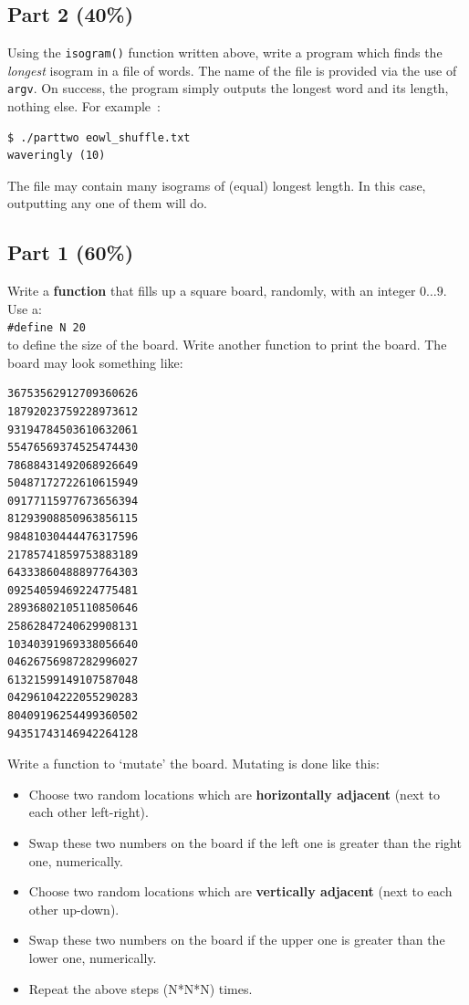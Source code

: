 \begin{appendices}
\subsection*{Part 2 (40\%)}
Using the \verb^isogram()^ function written above, write a program which finds the {\it longest} isogram in a
file of words. The name of the file is provided via the use of \verb^argv^.
On success, the program simply outputs the longest word and its length, nothing else. For
example~:
\begin{verbatim}
$ ./parttwo eowl_shuffle.txt
waveringly (10)
\end{verbatim}

The file may contain many isograms of (equal) longest length. In this case,
outputting any one of them will do. 

\subsection*{Part 1 (60\%)}

Write a {\bf function} that fills up a square board, randomly,
with an integer $0 \dots 9$. Use a:\\
\verb^#define N 20^\\
to define the size of the board.  Write another function to print the board.
The board may look something like:

{\small
\begin{verbatim}
36753562912709360626
18792023759228973612
93194784503610632061
55476569374525474430
78688431492068926649
50487172722610615949
09177115977673656394
81293908850963856115
98481030444476317596
21785741859753883189
64333860488897764303
09254059469224775481
28936802105110850646
25862847240629908131
10340391969338056640
04626756987282996027
61321599149107587048
04296104222055290283
80409196254499360502
94351743146942264128
\end{verbatim}
}

Write a
function to `mutate' the board. Mutating is done like this:
\begin{itemize}
\item Choose two random locations which are {\bf horizontally adjacent} (next to each other left-right).
\item Swap these two numbers on the board if the left one is greater than the right one, numerically.
\item Choose two random locations which are {\bf vertically adjacent} (next to each other up-down).
\item Swap these two numbers on the board if the upper one is greater than the lower one, numerically.
\item Repeat the above steps (N*N*N) times.
\end{itemize}


\end{appendices}
